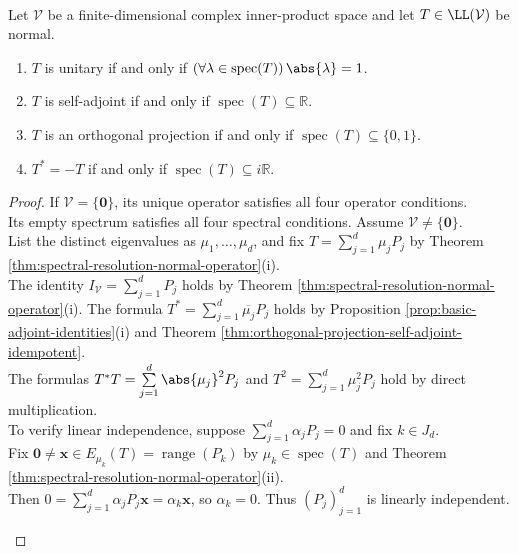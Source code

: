 \begin{theorem} \label{thm:normal-spectral-classification-by-eigenvalues} \\
Let $\mathcal{V}$ be a finite-dimensional complex inner-product space and let $T\in\LL(\mathcal{V})$ be normal.
\begin{enumerate}[label=(\roman*)]
\setlength{\itemsep}{0pt}
\item $T$ is unitary if and only if $(\forall\lambda\in\operatorname{spec}(T))\,\abs{\lambda}=1$.
\item $T$ is self-adjoint if and only if $\operatorname{spec}(T)\subseteq\mathbb{R}$.
\item $T$ is an orthogonal projection if and only if $\operatorname{spec}(T)\subseteq\{0,1\}$.
\item $T^*=-T$ if and only if $\operatorname{spec}(T)\subseteq i\mathbb{R}$.
\end{enumerate}
\begin{proof}
If $\mathcal{V}=\{\mathbf{0}\}$, its unique operator satisfies all four operator conditions.\\
Its empty spectrum satisfies all four spectral conditions. Assume $\mathcal{V}\neq\{\mathbf{0}\}$.\\
List the distinct eigenvalues as $\mu_1,\ldots,\mu_d$, and fix $T=\sum\limits_{j=1}^{d}\mu_jP_j$ by Theorem \ref{thm:spectral-resolution-normal-operator}(i).\\
The identity $I_{\mathcal{V}}=\sum\limits_{j=1}^{d}P_j$ holds by Theorem \ref{thm:spectral-resolution-normal-operator}(i). The formula $T^*=\sum\limits_{j=1}^{d}\overline{\mu_j}P_j$ holds by Proposition \ref{prop:basic-adjoint-identities}(i) and Theorem \ref{thm:orthogonal-projection-self-adjoint-idempotent}.\\
The formulas $T^*T=\sum\limits_{j=1}^{d}\abs{\mu_j}^2P_j$ and $T^2=\sum\limits_{j=1}^{d}\mu_j^2P_j$ hold by direct multiplication.\\
To verify linear independence, suppose $\sum\limits_{j=1}^{d}\alpha_jP_j=0$ and fix $k\in J_d$.\\
Fix $\mathbf{0}\neq\mathbf{x}\in E_{\mu_k}(T)=\operatorname{range}(P_k)$ by $\mu_k\in\operatorname{spec}(T)$ and Theorem \ref{thm:spectral-resolution-normal-operator}(ii).\\
Then $0=\sum\limits_{j=1}^{d}\alpha_jP_j\mathbf{x}=\alpha_k\mathbf{x}$, so $\alpha_k=0$. Thus $(P_j)_{j=1}^{d}$ is linearly independent.
\begin{enumerate}[label=(\roman*)]

\end{enumerate}
\end{proof}
\end{theorem}
